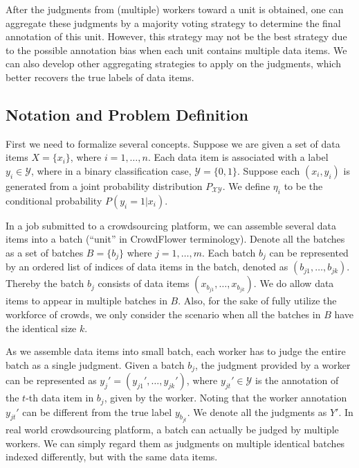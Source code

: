 After the judgments from (multiple) workers toward a unit is obtained, 
one can aggregate these judgments by a majority voting strategy to determine the final annotation of this unit.
However, this strategy may not be the best strategy due to the possible annotation bias when each unit contains multiple data items. 
We can also develop other aggregating strategies to apply on the judgments, 
which better recovers the true labels of data items.  


\subsection{Notation and Problem Definition}

First we need to formalize several concepts.  
Suppose we are given a set of data items $X = \{x_i\}$, where $i=1, \ldots, n$.  
Each data item is associated with a label $y_i \in \mathcal{Y}$,
where in a binary classification case, $\mathcal{Y} = \{0, 1\}$.  
Suppose each $(x_i, y_i)$ is generated from a joint probability distribution $P_{\mathcal{X} \mathcal{Y}}$.  
We define $\eta_i$ to be the conditional probability $P(y_i = 1 | x_i)$.  

In a job submitted to a crowdsourcing platform, 
we can assemble several data items into a batch (``unit'' in CrowdFlower terminology).  
Denote all the batches as a set of batches $B = \{b_j\}$ where $j = 1, \ldots, m$.  
Each batch $b_j$ can be represented by an ordered list of indices of data items in the batch, 
denoted as $(b_{j1}, \ldots, b_{jk})$.  
Thereby the batch $b_j$ consists of data items $(x_{b_{j1}}, \ldots, x_{b_{jk}})$.  
We do allow data items to appear in multiple batches in $B$.  
Also, for the sake of fully utilize the workforce of crowds, 
we only consider the scenario when all the batches in $B$ have the identical size $k$.  

As we assemble data items into small batch, 
each worker has to judge the entire batch as a single judgment.  
Given a batch $b_j$, the judgment provided by a worker can be represented as $y_j' = (y_{j1}', \ldots, y_{jk}')$, 
where $y_{j t}' \in \mathcal{Y}$ is the annotation of the $t$-th data item in $b_j$, given by the worker.  
Noting that the worker annotation $y_{j t}'$ can be different from the true label $y_{b_{j t}}$.  
We denote all the judgments as $Y'$.  
In real world crowdsourcing platform, a batch can actually be judged by multiple workers.  
We can simply regard them as judgments on multiple identical batches indexed differently, but with the same data items.  



